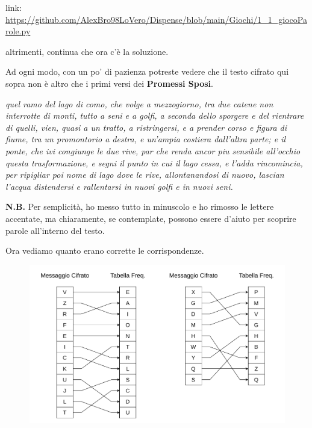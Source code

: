 \documentclass{rapport}
\begin{document}
\sloppy
link: \textcolor{maincolor}{\url{https://github.com/AlexBro98LoVero/Dispense/blob/main/Giochi/1_1_giocoParole.py}}

altrimenti, continua che ora c'è la soluzione.

\newpage
Ad ogni modo, con un po' di pazienza potreste vedere che il testo cifrato qui sopra non è altro che i primi versi dei \textbf{Promessi Sposi}.

\vspace{0.2cm}
\textit{quel ramo del lago di como, che volge a mezzogiorno, tra due catene non interrotte di monti, tutto a seni e a golfi, a seconda dello sporgere e del rientrare di quelli, vien, quasi a un tratto, a ristringersi, e a prender corso e figura di fiume, tra un promontorio a destra, e un’ampia costiera dall’altra parte; e il ponte, che ivi congiunge le due rive, par che renda ancor piu sensibile all’occhio questa trasformazione, e segni il punto in cui il lago cessa, e l’adda rincomincia, per ripigliar poi nome di lago dove le rive, allontanandosi di nuovo, lascian l’acqua distendersi e rallentarsi in nuovi golfi e in nuovi seni. }
\vspace{0.2cm}


\textbf{N.B.} Per semplicità, ho messo tutto in minuscolo e ho rimosso le lettere accentate, ma chiaramente, se contemplate, possono essere d'aiuto per scoprire parole all'interno del testo.

\vspace{0.2cm}

Ora vediamo quanto erano corrette le corrispondenze.


\begin{figure}[h]

    \centering
    \includegraphics[width=\linewidth]{logos/1_5_cripto.pdf}

\end{figure}
\end{document}
